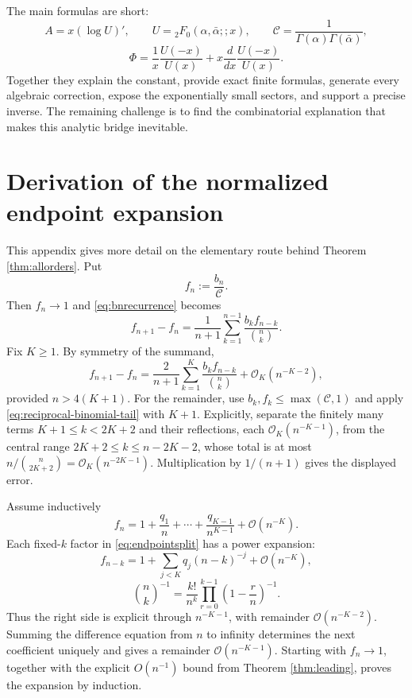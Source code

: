 \documentclass[11pt,a4paper]{article}
\theoremstyle{definition}
\theoremstyle{remark}
\newcommand{\bigO}{\mathcal{O}}
\newcommand{\constC}{\mathcal{C}}
\begin{document}
The main formulas are short:
\[
 A=x(\log U)',\qquad
 U={}_2F_0(\alpha,\bar\alpha;;x),\qquad
 \constC=\frac{1}{\Gamma(\alpha)\Gamma(\bar\alpha)},
\]
\[
 \Phi=\frac{1}{x}\frac{U(-x)}{U(x)}
 +x\frac{d}{dx}\frac{U(-x)}{U(x)}.
\]
Together they explain the constant, provide exact finite formulas, generate every algebraic correction, expose the exponentially small sectors, and support a precise inverse.  The remaining challenge is to find the combinatorial explanation that makes this analytic bridge inevitable.

\appendix

\section{Derivation of the normalized endpoint expansion}

This appendix gives more detail on the elementary route behind Theorem \ref{thm:allorders}.  Put
\[
 f_n:=\frac{b_n}{\constC}.
\]
Then \(f_n\to1\) and \eqref{eq:bnrecurrence} becomes
\begin{equation}\label{eq:fnrec}
 f_{n+1}-f_n
 =\frac{1}{n+1}\sum_{k=1}^{n-1}
 \frac{b_k f_{n-k}}{\binom{n}{k}}.
\end{equation}
Fix \(K\ge1\).  By symmetry of the summand,
\begin{equation}\label{eq:endpointsplit}
 f_{n+1}-f_n
 =\frac{2}{n+1}\sum_{k=1}^{K}
 \frac{b_k f_{n-k}}{\binom{n}{k}}+\bigO_K(n^{-K-2}),
\end{equation}
provided \(n>4(K+1)\).  For the remainder, use \(b_k,f_k\le\max(\constC,1)\) and apply \eqref{eq:reciprocal-binomial-tail} with \(K+1\).  Explicitly, separate the finitely many terms \(K+1\le k<2K+2\) and their reflections, each \(\bigO_K(n^{-K-1})\), from the central range \(2K+2\le k\le n-2K-2\), whose total is at most \(n/\binom{n}{2K+2}=\bigO_K(n^{-2K-1})\).  Multiplication by \(1/(n+1)\) gives the displayed error.

Assume inductively
\[
 f_n=1+\frac{q_1}{n}+\cdots+\frac{q_{K-1}}{n^{K-1}}
 +\bigO(n^{-K}).
\]
Each fixed-\(k\) factor in \eqref{eq:endpointsplit} has a power expansion:
\[
 f_{n-k}=1+\sum_{j<K}q_j(n-k)^{-j}+\bigO(n^{-K}),
\]
\[
 \binom{n}{k}^{-1}
 =\frac{k!}{n^k}\prod_{r=0}^{k-1}\left(1-\frac{r}{n}\right)^{-1}.
\]
Thus the right side is explicit through \(n^{-K-1}\), with remainder \(\bigO(n^{-K-2})\).  Summing the difference equation from \(n\) to infinity determines the next coefficient uniquely and gives a remainder \(\bigO(n^{-K-1})\).  Starting with \(f_n\to1\), together with the explicit \(O(n^{-1})\) bound from Theorem \ref{thm:leading}, proves the expansion by induction.
\end{document}
